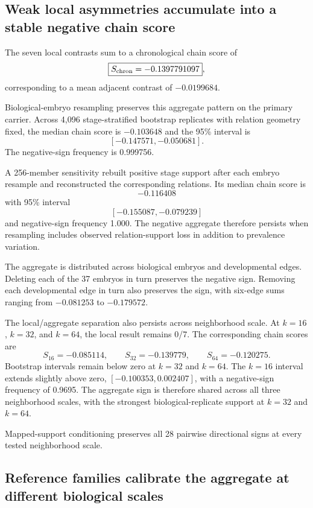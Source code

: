 \documentclass[11pt]{article}
\begin{document}
\subsection{Weak local asymmetries accumulate into a stable negative chain score}

The seven local contrasts sum to a chronological chain score of
\[
\boxed{S_{\rm chron}=-0.1397791097},
\]
corresponding to a mean adjacent contrast of $-0.0199684$.

Biological-embryo resampling preserves this aggregate pattern on the primary carrier. Across 4,096 stage-stratified bootstrap replicates with relation geometry fixed, the median chain score is $-0.103648$ and the 95\% interval is
\[
\boxed{[-0.147571,-0.050681]}.
\]
The negative-sign frequency is 0.999756.

A 256-member sensitivity rebuilt positive stage support after each embryo resample and reconstructed the corresponding relations. Its median chain score is
\[
-0.116408
\]
with 95\% interval
\[
\boxed{[-0.155087,-0.079239]}
\]
and negative-sign frequency 1.000. The negative aggregate therefore persists when resampling includes observed relation-support loss in addition to prevalence variation.

The aggregate is distributed across biological embryos and developmental edges. Deleting each of the 37 embryos in turn preserves the negative sign. Removing each developmental edge in turn also preserves the sign, with six-edge sums ranging from $-0.081253$ to $-0.179572$.

The local/aggregate separation also persists across neighborhood scale. At $k=16$, $k=32$, and $k=64$, the local result remains 0/7. The corresponding chain scores are
\[
S_{16}=-0.085114,\qquad
S_{32}=-0.139779,\qquad
S_{64}=-0.120275.
\]
Bootstrap intervals remain below zero at $k=32$ and $k=64$. The $k=16$ interval extends slightly above zero, $[-0.100353,0.002407]$, with a negative-sign frequency of 0.9695. The aggregate sign is therefore shared across all three neighborhood scales, with the strongest biological-replicate support at $k=32$ and $k=64$.

Mapped-support conditioning preserves all 28 pairwise directional signs at every tested neighborhood scale.

\subsection{Reference families calibrate the aggregate at different biological scales}
\end{document}
